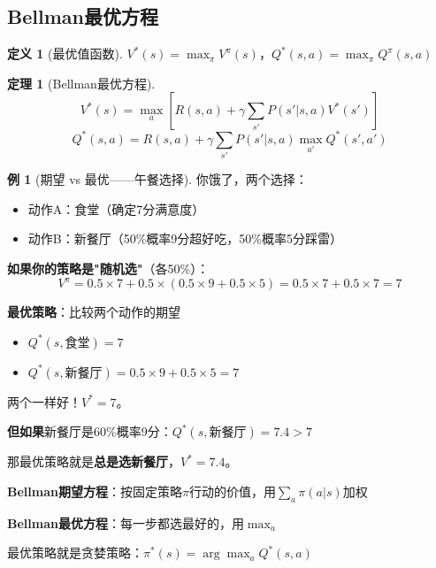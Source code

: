 \documentclass[11pt,a4paper]{article}
\theoremstyle{definition}
\newtheorem{definition}{定义}[section]
\newtheorem{example}{例}[section]
\newtheorem{theorem}{定理}[section]
\begin{document}
\subsection{Bellman最优方程}

\begin{definition}[最优值函数]
$V^*(s) = \max_\pi V^\pi(s)$，$Q^*(s,a) = \max_\pi Q^\pi(s,a)$
\end{definition}

\begin{theorem}[Bellman最优方程]
\[
V^*(s) = \max_a \left[R(s,a) + \gamma \sum_{s'} P(s'|s,a) V^*(s')\right]
\]
\[
Q^*(s,a) = R(s,a) + \gamma \sum_{s'} P(s'|s,a) \max_{a'} Q^*(s', a')
\]
\end{theorem}

\begin{example}[期望 vs 最优——午餐选择]
你饿了，两个选择：
\begin{itemize}
    \item 动作A：食堂（确定7分满意度）
    \item 动作B：新餐厅（50\%概率9分超好吃，50\%概率5分踩雷）
\end{itemize}

\textbf{如果你的策略是"随机选"}（各50\%）：
\[
V^{\pi} = 0.5 \times 7 + 0.5 \times (0.5 \times 9 + 0.5 \times 5) = 0.5 \times 7 + 0.5 \times 7 = 7
\]

\textbf{最优策略}：比较两个动作的期望
\begin{itemize}
    \item $Q^*(s, \text{食堂}) = 7$
    \item $Q^*(s, \text{新餐厅}) = 0.5 \times 9 + 0.5 \times 5 = 7$
\end{itemize}

两个一样好！$V^* = 7$。

\textbf{但如果}新餐厅是60\%概率9分：$Q^*(s, \text{新餐厅}) = 7.4 > 7$

那最优策略就是\textbf{总是选新餐厅}，$V^* = 7.4$。
\end{example}

\begin{plainwords}[期望 vs 最优]
\textbf{Bellman期望方程}：按固定策略$\pi$行动的价值，用$\sum_a \pi(a|s)$加权

\textbf{Bellman最优方程}：每一步都选最好的，用$\max_a$

最优策略就是贪婪策略：$\pi^*(s) = \arg\max_a Q^*(s,a)$
\end{plainwords}

\end{document}
